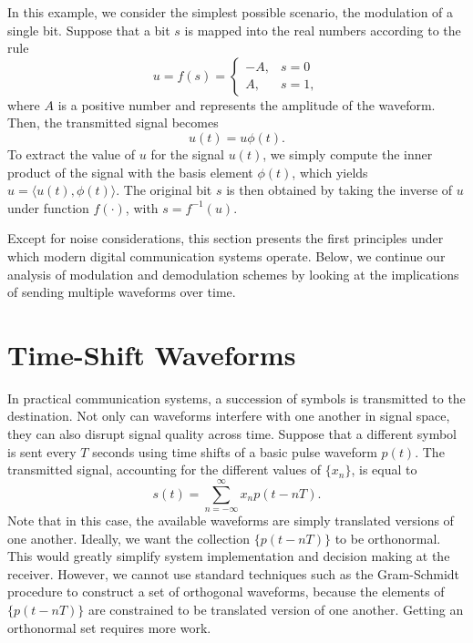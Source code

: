 \begin{example}
In this example, we consider the simplest possible scenario, the modulation of a single bit.
Suppose that a bit $s$ is mapped into the real numbers according to the rule
\begin{equation*}
u = f(s) = \begin{cases} -A, & s = 0 \\
A, & s = 1 , \end{cases}
\end{equation*}
where $A$ is a positive number and represents the amplitude of the waveform.
Then, the transmitted signal becomes
\begin{equation*}
u(t) = u \phi (t) .
\end{equation*}
To extract the value of $u$ for the signal $u(t)$, we simply compute the inner product of the signal with the basis element $\phi(t)$, which yields $u = \langle u(t), \phi(t) \rangle$.
The original bit $s$ is then obtained by taking the inverse of $u$ under function $f(\cdot)$, with $s = f^{-1} (u)$.
\end{example}

Except for noise considerations, this section presents the first principles under which modern digital communication systems operate.
Below, we continue our analysis of modulation and demodulation schemes by looking at the implications of sending multiple waveforms over time.
\fi

\section{Time-Shift Waveforms}

In practical communication systems, a succession of symbols is transmitted to the destination.
Not only can waveforms interfere with one another in signal space, they can also disrupt signal quality across time.
Suppose that a different symbol is sent every $T$ seconds using time shifts of a basic pulse waveform $p(t)$.
The transmitted signal, accounting for the different values of $\{ x_n \}$, is equal to
\begin{equation*}
s(t) = \sum_{n = -\infty}^{\infty} x_n p (t - nT) .
\end{equation*}
Note that in this case, the available waveforms are simply translated versions of one another.
Ideally, we want the collection $\{ p(t - nT) \}$ to be orthonormal.
This would greatly simplify system implementation and decision making at the receiver.
However, we cannot use standard techniques such as the Gram-Schmidt procedure to construct a set of orthogonal waveforms, because the elements of $\{ p(t - nT) \}$ are constrained to be translated version of one another.
Getting an orthonormal set requires more work.

